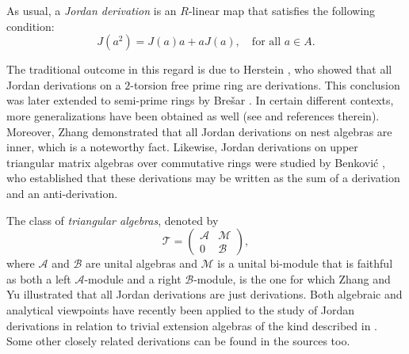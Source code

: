 \documentclass[12pt, reqno]{amsart}
\theoremstyle{definition}
\numberwithin{equation}{section}
\begin{document}
As usual, a \emph{Jordan derivation} is an $R$-linear map that satisfies the following condition:
\[
J(a^2) = J(a)a + aJ(a), \quad \text{for all } a \in A.
\]

The traditional outcome in this regard is due to Herstein \cite{Herstein}, who showed that all Jordan derivations on a $2$-torsion free prime ring are derivations. This conclusion was later extended to semi-prime rings by Brešar \cite{Bresar}. In certain different contexts, more generalizations have been obtained as well (see \cite{Zhang,Benkovic,Yu,Bresar2,Bresar3} and references therein). Moreover, Zhang \cite{ZhangNest} demonstrated that all Jordan derivations on nest algebras are inner, which is a noteworthy fact. Likewise, Jordan derivations on upper triangular matrix algebras over commutative rings were studied by Benković \cite{Benkovic}, who established that these derivations may be written as the sum of a derivation and an anti-derivation.

The class of {\it triangular algebras}, denoted by
\[
\mathcal{T} = \begin{pmatrix}
	\mathcal{A} & \mathcal{M} \\
	0 & \mathcal{B}
\end{pmatrix},
\]
where $\mathcal{A}$ and $\mathcal{B}$ are unital algebras and $\mathcal{M}$ is a unital bi-module that is faithful as both a left $\mathcal{A}$-module and a right $\mathcal{B}$-module, is the one for which Zhang and Yu \cite{Yu} illustrated that all Jordan derivations are just derivations. Both algebraic and analytical viewpoints have recently been applied to the study of Jordan derivations in relation to trivial extension algebras of the kind described in \cite{Ghahramani1,Ghahramani2,Bresar2}. Some other closely related derivations can be found in the sources \cite{B,CH,EA} too.

\medskip
\end{document}
